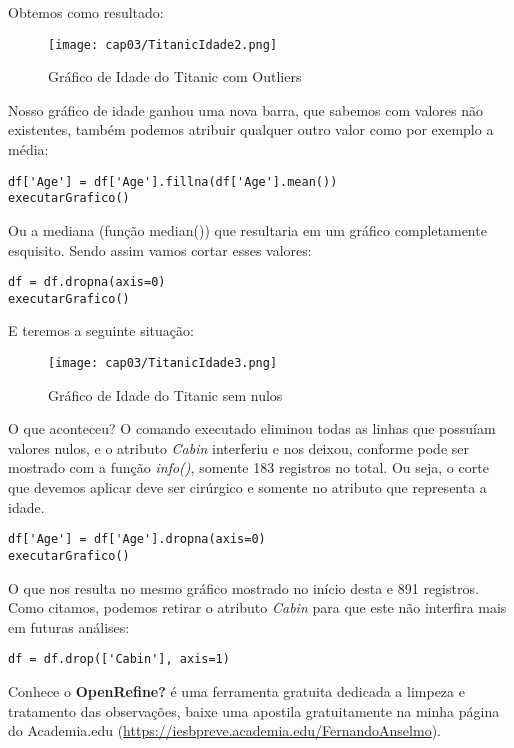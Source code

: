 Obtemos como resultado:
\begin{figure}[H]
	\centering
	\texttt{[image: cap03/TitanicIdade2.png]}
	\caption{Gráfico de Idade do Titanic com Outliers}
\end{figure}

Nosso gráfico de idade ganhou uma nova barra, que sabemos com valores não existentes, também podemos atribuir qualquer outro valor como por exemplo a média:
\begin{lstlisting}[]
df['Age'] = df['Age'].fillna(df['Age'].mean())
executarGrafico()
\end{lstlisting}

Ou a mediana (função median()) que resultaria em um gráfico completamente esquisito. Sendo assim vamos cortar esses valores:
\begin{lstlisting}[]
df = df.dropna(axis=0)
executarGrafico()
\end{lstlisting}

E teremos a seguinte situação:
\begin{figure}[H]
	\centering
	\texttt{[image: cap03/TitanicIdade3.png]}
	\caption{Gráfico de Idade do Titanic sem nulos}
\end{figure}

O que aconteceu? O comando executado eliminou todas as linhas que possuíam valores nulos, e o atributo \textit{Cabin} interferiu e nos deixou, conforme pode ser mostrado com a função \textit{info()}, somente 183 registros no total. Ou seja, o corte que devemos aplicar deve ser cirúrgico e somente no atributo que representa a idade.
\begin{lstlisting}[]
df['Age'] = df['Age'].dropna(axis=0)
executarGrafico()
\end{lstlisting}

O que nos resulta no mesmo gráfico mostrado no início desta e 891 registros. Como citamos, podemos retirar o atributo \textit{Cabin} para que este não interfira mais em futuras análises:
\begin{lstlisting}[]
df = df.drop(['Cabin'], axis=1)
\end{lstlisting}

\begin{note} 
	Conhece o \textbf{OpenRefine?} é uma ferramenta gratuita dedicada a limpeza e tratamento das observações, baixe uma apostila gratuitamente na minha página do Academia.edu (\url{https://iesbpreve.academia.edu/FernandoAnselmo}).
\end{note}

